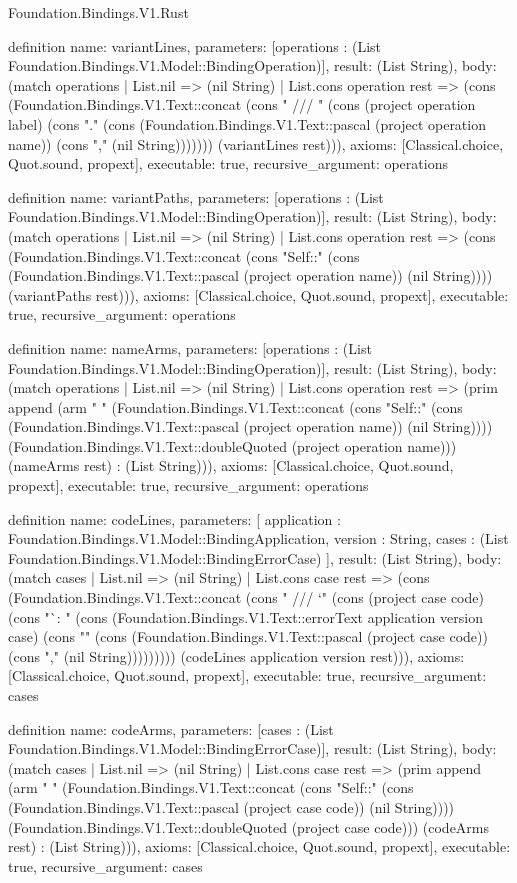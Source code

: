 \begin{lexlean}{Foundation.Bindings.V1.Rust}
\begin{semanticmodule}
{{definition{
  name: variantLines,
  parameters: [operations : (List Foundation.Bindings.V1.Model::BindingOperation)],
  result: (List String),
  body: (match operations
    | List.nil => (nil String)
    | List.cons operation rest => (cons (Foundation.Bindings.V1.Text::concat (cons "    /// " (cons (project operation label) (cons ".\n    " (cons (Foundation.Bindings.V1.Text::pascal (project operation name)) (cons "," (nil String))))))) (variantLines rest))),
  axioms: [Classical.choice, Quot.sound, propext],
  executable: true,
  recursive_argument: operations
}

definition{
  name: variantPaths,
  parameters: [operations : (List Foundation.Bindings.V1.Model::BindingOperation)],
  result: (List String),
  body: (match operations
    | List.nil => (nil String)
    | List.cons operation rest => (cons (Foundation.Bindings.V1.Text::concat (cons "Self::" (cons (Foundation.Bindings.V1.Text::pascal (project operation name)) (nil String)))) (variantPaths rest))),
  axioms: [Classical.choice, Quot.sound, propext],
  executable: true,
  recursive_argument: operations
}

definition{
  name: nameArms,
  parameters: [operations : (List Foundation.Bindings.V1.Model::BindingOperation)],
  result: (List String),
  body: (match operations
    | List.nil => (nil String)
    | List.cons operation rest => (prim append (arm "            " (Foundation.Bindings.V1.Text::concat (cons "Self::" (cons (Foundation.Bindings.V1.Text::pascal (project operation name)) (nil String)))) (Foundation.Bindings.V1.Text::doubleQuoted (project operation name))) (nameArms rest) : (List String))),
  axioms: [Classical.choice, Quot.sound, propext],
  executable: true,
  recursive_argument: operations
}

definition{
  name: codeLines,
  parameters: [
    application : Foundation.Bindings.V1.Model::BindingApplication,
    version : String,
    cases : (List Foundation.Bindings.V1.Model::BindingErrorCase)
  ],
  result: (List String),
  body: (match cases
    | List.nil => (nil String)
    | List.cons case rest => (cons (Foundation.Bindings.V1.Text::concat (cons "    /// `" (cons (project case code) (cons "`: " (cons (Foundation.Bindings.V1.Text::errorText application version case) (cons "\n    " (cons (Foundation.Bindings.V1.Text::pascal (project case code)) (cons "," (nil String))))))))) (codeLines application version rest))),
  axioms: [Classical.choice, Quot.sound, propext],
  executable: true,
  recursive_argument: cases
}

definition{
  name: codeArms,
  parameters: [cases : (List Foundation.Bindings.V1.Model::BindingErrorCase)],
  result: (List String),
  body: (match cases
    | List.nil => (nil String)
    | List.cons case rest => (prim append (arm "            " (Foundation.Bindings.V1.Text::concat (cons "Self::" (cons (Foundation.Bindings.V1.Text::pascal (project case code)) (nil String)))) (Foundation.Bindings.V1.Text::doubleQuoted (project case code))) (codeArms rest) : (List String))),
  axioms: [Classical.choice, Quot.sound, propext],
  executable: true,
  recursive_argument: cases
}

}}
\end{semanticmodule}
\end{lexlean}
